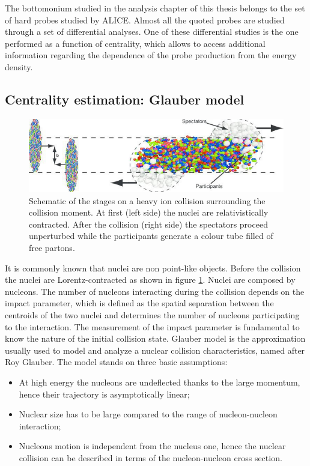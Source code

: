 The bottomonium studied in the analysis chapter of this thesis belongs to the set of hard probes studied by ALICE.
Almost all the quoted probes are studied through a set of differential analyses.
One of these differential studies is the one performed as a function of centrality, which allows to access additional information regarding the dependence of the probe production from the energy density.

\subsection{Centrality estimation: Glauber model}
\label{intro_glauber}

\begin{figure}[!ht]
\begin{center}
\includegraphics[width=0.99\linewidth]{Chapters/Introduction/Figs/collision.pdf}
\caption{Schematic of the stages on a heavy ion collision surrounding the collision moment. At first (left side) the nuclei are relativistically contracted. After the collision (right side) the spectators proceed unperturbed while the participants generate a colour tube filled of free partons.}
\label{fig:collision}
\end{center}
\end{figure}

It is commonly known that nuclei are non point-like objects.
Before the collision the nuclei are Lorentz-contracted as shown in figure \ref{fig:collision}.
Nuclei are composed by nucleons. The number of nucleons interacting during the collision depends on the impact parameter, which is defined as the spatial separation between the centroids of the two nuclei and determines the number of nucleons participating to the interaction.
The measurement of the impact parameter is fundamental to know the nature of the initial collision state.
Glauber model is the approximation usually used to model and analyze a nuclear collision characteristics, named after Roy Glauber.
The model stands on three basic assumptions:
\begin{itemize}
\item At high energy the nucleons are undeflected thanks to the large momentum, hence their trajectory is asymptotically linear;
\item Nuclear size has to be large compared to the range of nucleon-nucleon interaction;
\item Nucleons motion is independent from the nucleus one, hence the nuclear collision can be described in terms of the nucleon-nucleon cross section.
\end{itemize}

